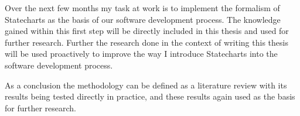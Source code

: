\documentclass[a4paper, bibliography=totoc, oneside, 12pt]{scrbook}
\begin{document}
Over the next few months my task at work is to implement the formalism of Statecharts as the basis of our software development process. The knowledge gained within this first step will be directly included in this thesis and used for further research. Further the research done in the context of writing this thesis will be used proactively to improve the way I introduce Statecharts into the software development process.

As a conclusion the methodology can be defined as a literature review with its results being tested directly in practice, and these results again used as the basis for further research.


\nocite{*}
\printbibliography[heading=none]
\end{document}
